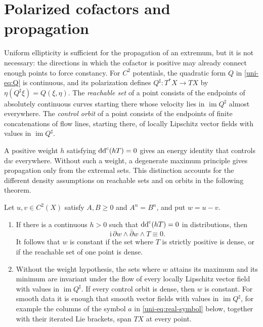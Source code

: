 \section{Polarized cofactors and propagation}
\label{uni-sec:cofactor}

Uniform ellipticity is sufficient for the propagation of an extremum, but it is not necessary: the directions in which the cofactor is positive may already connect enough points to force constancy. For $C^2$ potentials, the quadratic form $Q$ in \eqref{uni-eq:Q} is continuous, and its polarization defines $Q^\sharp\colon T^*X\to TX$ by $\eta(Q^\sharp\xi)=Q(\xi,\eta)$. The \emph{reachable set} of a point consists of the endpoints of absolutely continuous curves starting there whose velocity lies in $\operatorname{im}Q^\sharp$ almost everywhere. The \emph{control orbit} of a point consists of the endpoints of finite concatenations of flow lines, starting there, of locally Lipschitz vector fields with values in $\operatorname{im}Q^\sharp$.

A positive weight $h$ satisfying $\mathrm{dd}^{\mathrm{c}}(hT)=0$ gives an energy identity that controls $\mathrm{d}w$ everywhere. Without such a weight, a degenerate maximum principle gives propagation only from the extremal sets. This distinction accounts for the different density assumptions on reachable sets and on orbits in the following theorem.

\begin{theorem}\label{uni-thm:cofactor-intro}
Let $u,v\in C^2(X)$ satisfy $A,B\geq0$ and $A^n=B^n$, and put $w=u-v$.
\begin{enumerate}
\item If there is a continuous $h>0$ such that
$\mathrm{dd}^{\mathrm{c}}(hT)=0$ in distributions, then
\begin{equation}
  \mathrm{i}\,\partial w\wedge\bar\partial w\wedge T\equiv0.
  \label{uni-eq:energyzero}
\end{equation}
It follows that $w$ is constant if the set where $T$ is strictly positive
is dense, or if the reachable set of one point is dense.
\item Without the weight hypothesis, the sets where $w$ attains its maximum and its minimum
are invariant under the flow of every locally Lipschitz vector field with values
in $\operatorname{im}Q^\sharp$.  If every control orbit is dense,
then $w$ is constant.  For smooth data it is enough that smooth vector
fields with values in $\operatorname{im}Q^\sharp$, for example the columns of the symbol $a$ in \eqref{uni-eq:real-symbol} below, together with their iterated Lie brackets,
span $TX$ at every point.
\end{enumerate}
\end{theorem}

